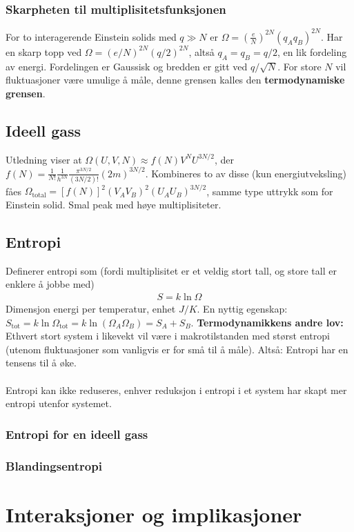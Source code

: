 \documentclass[12pt]{article}
\begin{document}
\subsubsection{Skarpheten til multiplisitetsfunksjonen}
For to interagerende Einstein solids med $q \gg N$ er $\Omega = \left(\frac{e}{N}\right)^{2N} (q_A q_B)^{2N}.$
Har en skarp topp ved $\Omega = (e/N)^{2N} (q/2)^{2N}$, altså $q_A = q_B = q/2$,
en lik fordeling av energi. Fordelingen er Gaussisk og bredden er gitt ved $q/\sqrt{N}$.
For store $N$ vil fluktuasjoner være umulige å måle, denne grensen kalles den \textbf{termodynamiske grensen}.
\subsection{Ideell gass}
Utledning viser at $\Omega(U,V,N) \approx f(N) V^N U^{3N/2}$, der $f(N) = \frac{1}{N!} \frac{1}{h^{3N}} \frac{\pi^{3N/2}}{(3N/2)!} (2m)^{3N/2}$.
Kombineres to av disse (kun energiutveksling) fåes $\Omega_\text{total} = [f(N)]^2 (V_A V_B)^2 (U_A U_B)^{3N/2}$,
samme type uttrykk som for Einstein solid. Smal peak med høye multiplisiteter.
\subsection{Entropi}
Definerer entropi som (fordi multiplisitet er et veldig stort tall, og store tall er enklere å jobbe med)
\begin{align*}
  S = k \ln{\Omega}
\end{align*}
Dimensjon energi per temperatur, enhet $J/K$. En nyttig egenskap: $S_\text{tot} = k \ln{\Omega_\text{tot}} = k \ln{(\Omega_A \Omega_B)} = S_A + S_B$. \newline \noindent
\textbf{Termodynamikkens andre lov:} Ethvert stort system i likevekt vil være i
makrotilstanden med størst entropi (utenom fluktuasjoner som vanligvis er for små
til å måle). Altså: Entropi har en tensens til å øke.
\\ \\
Entropi kan ikke reduseres, enhver reduksjon i entropi i et system har skapt
mer entropi utenfor systemet.
\subsubsection{Entropi for en ideell gass}
\subsubsection{Blandingsentropi}
\section{Interaksjoner og implikasjoner}
\end{document}
